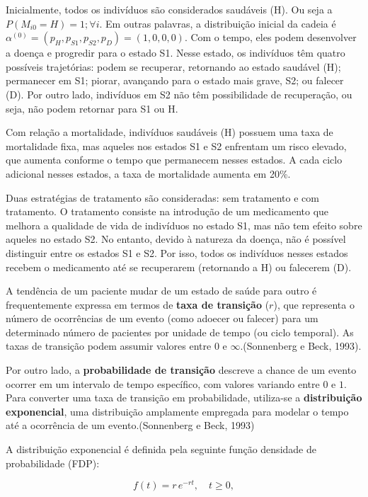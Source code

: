 \documentclass[12pt]{article}
\theoremstyle{break}
\begin{document}
Inicialmente, todos os indivíduos são considerados saudáveis (H). Ou seja a $P(M_{i0} = H) = 1 ;  \forall i $. Em outras palavras, a distribuição inicial da cadeia é $\alpha^{(0)} = (p_H,p_{S1},p_{S2},p_{D}) = (1,0,0,0) $.
Com o tempo, eles podem desenvolver a doença e progredir para o estado S1. Nesse estado, os indivíduos têm quatro possíveis trajetórias: podem se recuperar, retornando ao estado saudável (H); permanecer em S1; piorar, avançando para o estado mais grave, S2; ou falecer (D). Por outro lado, indivíduos em S2 não têm possibilidade de recuperação, ou seja, não podem retornar para S1 ou H.

Com relação a mortalidade, indivíduos saudáveis (H) possuem uma taxa de mortalidade fixa, mas aqueles nos estados S1 e S2 enfrentam um risco elevado, que aumenta conforme o tempo que permanecem nesses estados. A cada ciclo adicional nesses estados, a taxa de mortalidade aumenta em 20\%. 

Duas estratégias de tratamento são consideradas: sem tratamento e com tratamento. O tratamento consiste na introdução de um medicamento que melhora a qualidade de vida de indivíduos no estado S1, mas não tem efeito sobre aqueles no estado S2. No entanto, devido à natureza da doença, não é possível distinguir entre os estados S1 e S2. Por isso, todos os indivíduos nesses estados recebem o medicamento até se recuperarem (retornando a H) ou falecerem (D).





A tendência de um paciente mudar de um estado de saúde para outro é frequentemente expressa em termos de \textbf{taxa de transição} (\( r \)), que representa o número de ocorrências de um evento (como adoecer ou falecer) para um determinado número de pacientes por unidade de tempo (ou ciclo temporal). As taxas de transição podem assumir valores entre \( 0 \) e \( \infty \).(Sonnenberg e Beck, 1993).

Por outro lado, a \textbf{probabilidade de transição} descreve a chance de um evento ocorrer em um intervalo de tempo específico, com valores variando entre \( 0 \) e \( 1 \). Para converter uma taxa de transição em probabilidade, utiliza-se a \textbf{distribuição exponencial}, uma distribuição amplamente empregada para modelar o tempo até a ocorrência de um evento.(Sonnenberg e Beck, 1993)

A distribuição exponencial é definida pela seguinte função densidade de probabilidade (FDP):

\[
f(t) = r \, e^{-r t}, \quad t \geq 0,
\]
\end{document}
